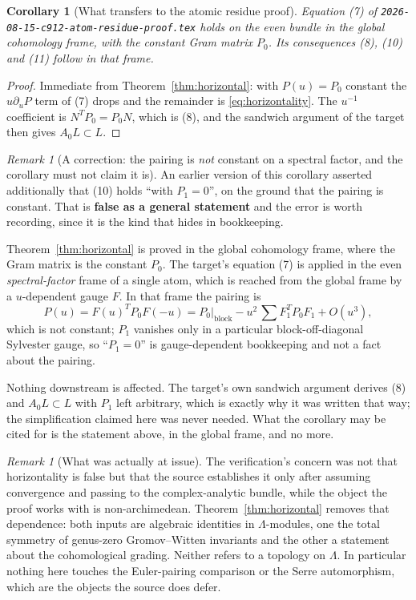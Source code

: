 \documentclass[11pt]{article}
\newtheorem{corollary}[theorem]{Corollary}
\theoremstyle{definition}
\theoremstyle{remark}
\newtheorem{remark}[theorem]{Remark}
\newcommand{\Nov}{\Lambda}
\begin{document}
\begin{corollary}[What transfers to the atomic residue proof]
\label{cor:for-atom}
Equation \textup{(7)} of \texttt{2026-08-15-c912-atom-residue-proof.tex} holds on
the even bundle in the global cohomology frame, with the constant Gram matrix
$P_0$. Its consequences \textup{(8)}, \textup{(10)} and \textup{(11)} follow in
that frame.
\end{corollary}

\begin{proof}
Immediate from Theorem~\ref{thm:horizontal}: with $P(u)=P_0$ constant the
$u\partial_uP$ term of (7) drops and the remainder is
\eqref{eq:horizontality}. The $u^{-1}$ coefficient is $N^TP_0=P_0N$, which is
(8), and the sandwich argument of the target then gives $A_0L\subset L$.
\end{proof}

\begin{remark}[A correction: the pairing is \emph{not} constant on a spectral
factor, and the corollary must not claim it is]
\label{rem:p1-correction}
An earlier version of this corollary asserted additionally that (10) holds
``with $P_1=0$'', on the ground that the pairing is constant. That is
\textbf{false as a general statement} and the error is worth recording, since it
is the kind that hides in bookkeeping.

Theorem~\ref{thm:horizontal} is proved in the global cohomology frame, where the
Gram matrix is the constant $P_0$. The target's equation (7) is applied in the
even \emph{spectral-factor} frame of a single atom, which is reached from the
global frame by a $u$-dependent gauge $F$. In that frame the pairing is
\[
  P(u)=F(u)^TP_0F(-u)
  =P_0|_{\mathrm{block}}-u^2\,\textstyle\sum F_1^TP_0F_1+O(u^3),
\]
which is not constant; $P_1$ vanishes only in a particular
block-off-diagonal Sylvester gauge, so ``$P_1=0$'' is gauge-dependent
bookkeeping and not a fact about the pairing.

Nothing downstream is affected. The target's own sandwich argument derives (8)
and $A_0L\subset L$ with $P_1$ left arbitrary, which is exactly why it was
written that way; the simplification claimed here was never needed. What the
corollary may be cited for is the statement above, in the global frame, and no
more.
\end{remark}

\begin{remark}[What was actually at issue]
The verification's concern was not that horizontality is false but that the
source establishes it only after assuming convergence and passing to the
complex-analytic bundle, while the object the proof works with is
non-archimedean. Theorem~\ref{thm:horizontal} removes that dependence: both
inputs are algebraic identities in $\Nov$-modules, one the total symmetry of
genus-zero Gromov--Witten invariants and the other a statement about the
cohomological grading. Neither refers to a topology on $\Nov$. In particular
nothing here touches the Euler-pairing comparison or the Serre automorphism,
which are the objects the source does defer.
\end{remark}
\end{document}
